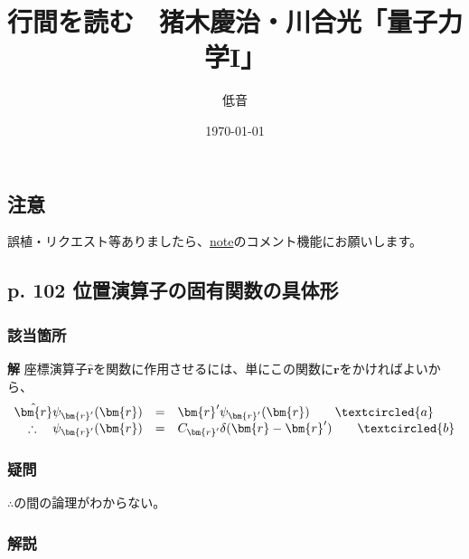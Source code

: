 \documentclass{jsarticle}
\title{行間を読む　猪木慶治・川合光「量子力学I」}
\author{低音}
\date{\today}
\begin{document}
\maketitle
\tableofcontents

\subsection{注意}
誤植・リクエスト等ありましたら、\href{https://note.com/teion_burns/n/nfc8de0fab123}{note}のコメント機能にお願いします。


\subsection*{p. 102 位置演算子の固有関数の具体形}

\subsubsection*{該当箇所}

\textbf{解}  座標演算子$\hat{\bm{r}}$を関数に作用させるには、単にこの関数に$\bm{r}$をかければよいから、
\begin{equation}
    \begin{array}{rcl}
        \hat{\bm{r}}\psi_{\bm{r}'}(\bm{r})
        &=&
        \bm{r}'\psi_{\bm{r}'}(\bm{r})\qquad\textcircled{a}
        \\
        \therefore\quad\psi_{\bm{r}'}(\bm{r})
        &=&
        C_{\bm{r}'}\delta(\bm{r}-\bm{r}')\qquad\textcircled{b}
    \end{array}
\end{equation}

\subsubsection*{疑問}
${\therefore}$の間の論理がわからない。

\subsubsection*{解説}
\end{document}
